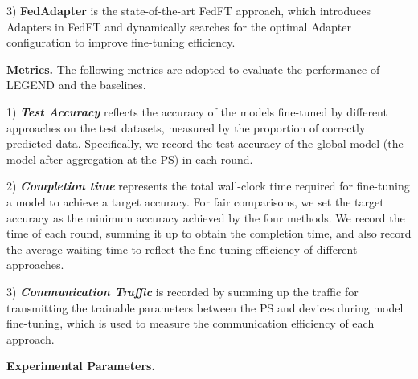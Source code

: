3) \textbf{FedAdapter} 
is the state-of-the-art FedFT approach, which introduces Adapters \cite{houlsby2019parameter} in FedFT and dynamically searches for the optimal Adapter configuration to improve fine-tuning efficiency.


\textbf{Metrics.}
The following metrics are adopted to evaluate the performance of LEGEND and the baselines.

1) \textbf{\textit{Test Accuracy}} reflects the accuracy of the models fine-tuned by different approaches on the test datasets, measured by the proportion of correctly predicted data.
Specifically, we record the test accuracy of the global model (the model after aggregation at the PS) in each round.

2) \textit{\textbf{Completion time}} represents the total wall-clock time required for fine-tuning a model to achieve a target accuracy. 
For fair comparisons, we set the target accuracy as the minimum accuracy achieved by the four methods. 
We record the time of each round, summing it up to obtain the completion time, and also record the average waiting time to reflect the fine-tuning efficiency of different approaches.

3) \textit{\textbf{Communication Traffic}} is recorded by summing up the traffic for transmitting the trainable parameters between the PS and devices during model fine-tuning, which is used to measure the communication efficiency of each approach.

\textbf{Experimental Parameters.}
\vspace{-0.2cm}


